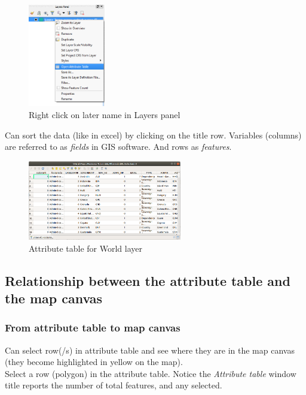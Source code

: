 \begin{figure}[!h]
	\centering
	\includegraphics[width=0.3\textwidth]{images/right_click_layername_cropped.png}
	\caption{Right click on later name in Layers panel}
	\label{ft_fig_firstfig3}
\end{figure}

Can sort the data (like in excel) by clicking on the title row. Variables (columns) are referred to as \textit{fields} in GIS software. And rows as \textit{features}.\\

\begin{figure}[!h]
	\centering
	\includegraphics[width=0.6\textwidth]{images/world_attribute_table.png}
	\caption{Attribute table for World layer}
	\label{ft_fig_firstfig3}
\end{figure}

\subsection{Relationship between the attribute table and the map canvas}

\subsubsection{From attribute table to map canvas}
Can select row(/s) in attribute table and see where they are in the map canvas (they become highlighted in yellow on the map).\\

Select a row (polygon) in the attribute table. Notice the \textit{Attribute table} window title reports the number of total features, and any selected.\\

